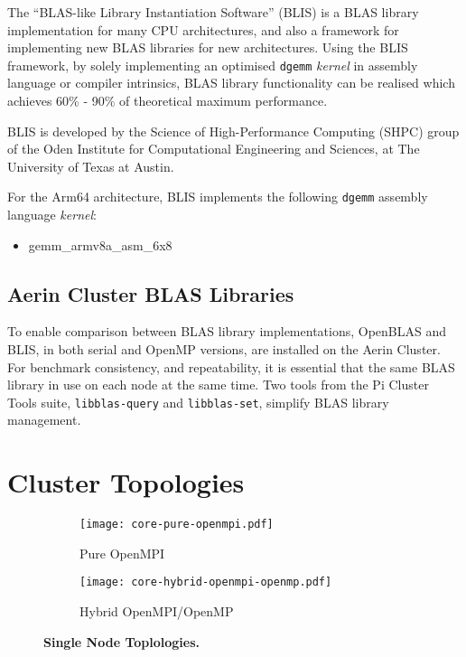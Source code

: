 The ``BLAS-like Library Instantiation Software'' (BLIS) is a BLAS library implementation for many CPU architectures, and also a framework for implementing new BLAS libraries for new architectures. Using the BLIS framework, by solely implementing an optimised \verb|dgemm| \emph{kernel} in assembly language or compiler intrinsics, BLAS library functionality can be realised which achieves 60\% - 90\% of theoretical maximum performance.

BLIS is developed by the Science of High-Performance Computing (SHPC) group of the Oden Institute for Computational Engineering and Sciences, at The University of Texas at Austin.

For the Arm64 architecture, BLIS implements the following \verb|dgemm| assembly language \emph{kernel}:

\begin{itemize}
  \item gemm\_armv8a\_asm\_6x8
\end{itemize}


%
%
\subsection{Aerin Cluster BLAS Libraries}

To enable comparison between BLAS library implementations, OpenBLAS and BLIS, in both serial and OpenMP versions, are installed on the Aerin Cluster. For benchmark consistency, and repeatability, it is essential that the same BLAS library in use on each node at the same time. Two tools from the Pi Cluster Tools suite, \verb|libblas-query| and \verb|libblas-set|, simplify BLAS library management. 

%
%
\section{Cluster Topologies}

\begin{figure}
	\begin{subfigure}{1.0\textwidth}
		\centering
		\texttt{[image: core-pure-openmpi.pdf]}
		\caption{Pure OpenMPI}
		\label{fig:subim1}
	\end{subfigure}
	\par\bigskip
	\begin{subfigure}{1.0\textwidth}
		\centering
		\texttt{[image: core-hybrid-openmpi-openmp.pdf]}
		\caption{Hybrid OpenMPI/OpenMP}
		\label{fig:subim2}
	\end{subfigure}
\caption{\textbf{Single Node Toplologies.}}
\label{fig:image2}
\end{figure}


